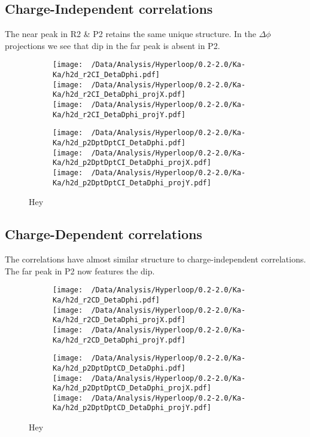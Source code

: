 \documentclass[12pt,a4paper,twoside]{report}
\begin{document}
\subsection{Charge-Independent correlations}
The near peak in R2 \& P2 retains the same unique structure. In the $\Delta\phi$ projections we see that dip in the far peak is absent in P2.
\begin{figure}[H]
	\begin{subfigure}{0.49\linewidth}
		\texttt{[image: ~/Data/Analysis/Hyperloop/0.2-2.0/Ka-Ka/h2d\_r2CI\_DetaDphi.pdf]}\\
		\texttt{[image: ~/Data/Analysis/Hyperloop/0.2-2.0/Ka-Ka/h2d\_r2CI\_DetaDphi\_projX.pdf]}\\
		\texttt{[image: ~/Data/Analysis/Hyperloop/0.2-2.0/Ka-Ka/h2d\_r2CI\_DetaDphi\_projY.pdf]}\\
	\end{subfigure}
	\begin{subfigure}{0.49\linewidth}
		\texttt{[image: ~/Data/Analysis/Hyperloop/0.2-2.0/Ka-Ka/h2d\_p2DptDptCI\_DetaDphi.pdf]}\\
		\texttt{[image: ~/Data/Analysis/Hyperloop/0.2-2.0/Ka-Ka/h2d\_p2DptDptCI\_DetaDphi\_projX.pdf]}\\
		\texttt{[image: ~/Data/Analysis/Hyperloop/0.2-2.0/Ka-Ka/h2d\_p2DptDptCI\_DetaDphi\_projY.pdf]}\\
	\end{subfigure}
	\caption{Hey}
\end{figure}
\subsection{Charge-Dependent correlations}
The correlations have almost similar structure to charge-independent correlations. The far peak in P2 now features the dip.
\begin{figure}[H]
	\begin{subfigure}{0.49\linewidth}
		\texttt{[image: ~/Data/Analysis/Hyperloop/0.2-2.0/Ka-Ka/h2d\_r2CD\_DetaDphi.pdf]}\\
		\texttt{[image: ~/Data/Analysis/Hyperloop/0.2-2.0/Ka-Ka/h2d\_r2CD\_DetaDphi\_projX.pdf]}\\
		\texttt{[image: ~/Data/Analysis/Hyperloop/0.2-2.0/Ka-Ka/h2d\_r2CD\_DetaDphi\_projY.pdf]}\\
	\end{subfigure}
	\begin{subfigure}{0.49\linewidth}
		\texttt{[image: ~/Data/Analysis/Hyperloop/0.2-2.0/Ka-Ka/h2d\_p2DptDptCD\_DetaDphi.pdf]}\\
		\texttt{[image: ~/Data/Analysis/Hyperloop/0.2-2.0/Ka-Ka/h2d\_p2DptDptCD\_DetaDphi\_projX.pdf]}\\
		\texttt{[image: ~/Data/Analysis/Hyperloop/0.2-2.0/Ka-Ka/h2d\_p2DptDptCD\_DetaDphi\_projY.pdf]}\\
	\end{subfigure}
	\caption{Hey}
\end{figure}
\end{document}
